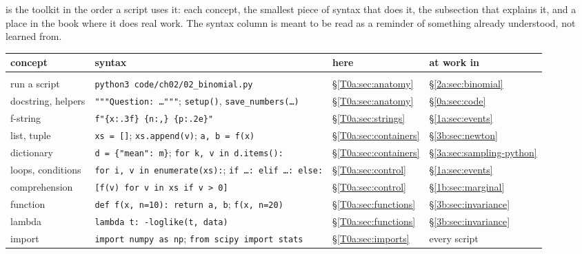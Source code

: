  is the toolkit in the order a script uses it: each concept, the smallest piece of syntax that does it, the subsection that explains it, and a place in the book where it does real work. The syntax column is meant to be read as a reminder of something already understood, not learned from.

\begin{table}[p]
\centering
\footnotesize
\renewcommand{\arraystretch}{1.12}
\begin{tabularx}{\linewidth}{@{}>{\raggedright\arraybackslash}p{2.75cm}
                               >{\raggedright\arraybackslash}X
                               >{\raggedright\arraybackslash}p{1.25cm}
                               >{\raggedright\arraybackslash}p{1.9cm}@{}}
\toprule
concept & syntax & here & at work in\\\midrule
\multicolumn{4}{@{}l}{\textbf{A script and plain Python}}\\
run a script & \texttt{python3 code/ch02/02\_binomial.py} & \S\ref{T0a:sec:anatomy} & \S\ref{2a:sec:binomial}\\
docstring, helpers & \texttt{"""Question: \dots"""}; \texttt{setup()}, \texttt{save\_numbers(\dots)} & \S\ref{T0a:sec:anatomy} & \S\ref{0a:sec:code}\\
f-string & \texttt{f"\{x:.3f\} \{n:,\} \{p:.2e\}"} & \S\ref{T0a:sec:strings} & \S\ref{1a:sec:events}\\
list, tuple & \texttt{xs = []}; \texttt{xs.append(v)}; \texttt{a, b = f(x)} & \S\ref{T0a:sec:containers} & \S\ref{3b:sec:newton}\\
dictionary & \texttt{d = \{"mean": m\}}; \texttt{for k, v in d.items():} & \S\ref{T0a:sec:containers} & \S\ref{3a:sec:sampling-python}\\
loops, conditions & \texttt{for i, v in enumerate(xs):}; \texttt{if \dots: elif \dots: else:} & \S\ref{T0a:sec:control} & \S\ref{1a:sec:events}\\
comprehension & \texttt{[f(v) for v in xs if v > 0]} & \S\ref{T0a:sec:control} & \S\ref{1b:sec:marginal}\\
function & \texttt{def f(x, n=10): return a, b}; \texttt{f(x, n=20)} & \S\ref{T0a:sec:functions} & \S\ref{3b:sec:invariance}\\
lambda & \texttt{lambda t: -loglike(t, data)} & \S\ref{T0a:sec:functions} & \S\ref{3b:sec:invariance}\\
import & \texttt{import numpy as np}; \texttt{from scipy import stats} & \S\ref{T0a:sec:imports} & every script\\

\end{tabularx}
\end{table}
